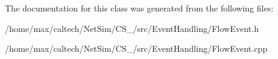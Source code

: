 \-The documentation for this class was generated from the following files\-:\begin{DoxyCompactItemize}
\item 
/home/max/caltech/\-Net\-Sim/\-C\-S\-\_/src/\-Event\-Handling/\-Flow\-Event.\-h\item 
/home/max/caltech/\-Net\-Sim/\-C\-S\-\_/src/\-Event\-Handling/\-Flow\-Event.\-cpp\end{DoxyCompactItemize}
